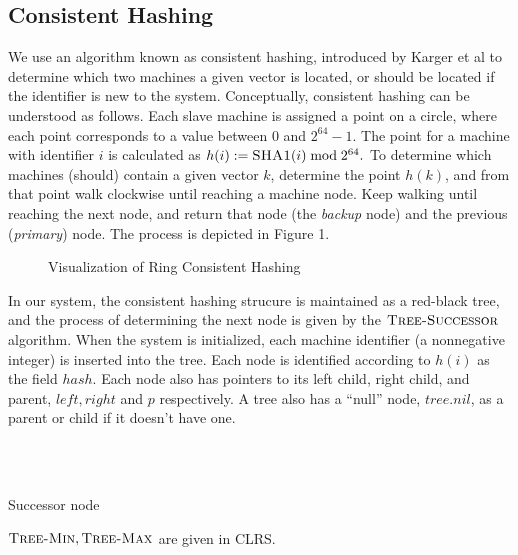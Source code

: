 \subsection{Consistent Hashing}
We use an algorithm known as consistent hashing, introduced by Karger et al \cite{karger1997} to determine which two machines a given vector is located, or
should be located if the identifier is new to the system.
Conceptually, consistent hashing can be understood as follows. Each slave machine is assigned a point on a circle, where each point
corresponds to a value between $0$ and $2^{64}-1.$ The point for a machine with identifier $i$ is calculated as $h(i):=\textsc{SHA1}(i)\bmod 2^{64}.$ To determine which machines (should) contain a given vector $k$, determine the point $h(k)$, and from that point walk clockwise until reaching a machine node. Keep walking until reaching the next node, and return that node (the \emph{backup} node) and the previous (\emph{primary}) node. The process is depicted in Figure 1.
\begin{figure}
    \centering
    
    \caption{Visualization of Ring Consistent Hashing}
\end{figure}
In our system, the consistent hashing strucure is maintained as a red-black tree, and the process of determining the next node is given by the $\textsc{Tree-Successor}$ algorithm. When the system is initialized,
each machine identifier (a nonnegative integer) is inserted into the tree. Each node is identified according to $h(i)$ as the field $hash$. Each node also has pointers to its left child, right child, and parent, $left, right$ and $p$ respectively.
A tree also has a ``null'' node, $tree.nil$, as a parent or child if it doesn't have one.
\begin{algorithm}
    \begin{algorithmic}
      \\
      \Else\\
      \EndIf
    \end{algorithmic}
\caption{Successor node \cite{https://www.geeksforgeeks.org/inorder-predecessor-successor-given-key-bst/}}
\end{algorithm}
$\textsc{Tree-Min},\textsc{Tree-Max}$ are given in CLRS.
